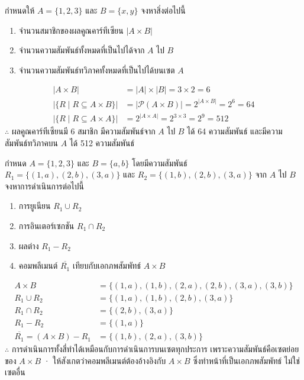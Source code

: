 \begin{ex}
\label{ex:total-relations-count}
กำหนดให้ $A = \{1, 2, 3\}$ และ $B = \{x, y\}$ จงหาสิ่งต่อไปนี้
\begin{enumerate}[label=\textbf{\arabic*.}]
    \item จำนวนสมาชิกของผลคูณคาร์ทีเซียน $|A \times B|$
    \item จำนวนความสัมพันธ์ทั้งหมดที่เป็นไปได้จาก $A$ ไป $B$
    \item จำนวนความสัมพันธ์ทวิภาคทั้งหมดที่เป็นไปได้บนเซต $A$
\end{enumerate}
\end{ex}
\begin{solution}
\begin{align*}
|A \times B| &= |A| \times |B| = 3 \times 2 = 6\\
\lvert\{R \mid R \subseteq A \times B\}\rvert &= \lvert \mathcal{P}(A \times B) \rvert = 2^{|A \times B|} = 2^6 = 64\\
\lvert\{R \mid R \subseteq A \times A\}\rvert &= 2^{|A \times A|} = 2^{3 \times 3} = 2^9 = 512
\end{align*}
$\therefore$ ผลคูณคาร์ทีเซียนมี 6 สมาชิก มีความสัมพันธ์จาก $A$ ไป $B$ ได้ 64 ความสัมพันธ์ และมีความสัมพันธ์ทวิภาคบน $A$ ได้ 512 ความสัมพันธ์ \solhere
\end{solution}

\begin{ex}
\label{ex:relation-operations}
กำหนด $A = \{1, 2, 3\}$ และ $B = \{a, b\}$ โดยมีความสัมพันธ์ $R_1 = \{(1,a), (2,b), (3,a)\}$ และ $R_2 = \{(1,b), (2,b), (3,a)\}$ จาก $A$ ไป $B$ จงหาการดำเนินการต่อไปนี้
\begin{enumerate}[label=\textbf{\arabic*.}]
    \item การยูเนียน $R_1 \cup R_2$
    \item การอินเตอร์เซกชัน $R_1 \cap R_2$
    \item ผลต่าง $R_1 - R_2$
    \item คอมพลีเมนต์ $\overline{R_1}$ เทียบกับเอกภพสัมพัทธ์ $A \times B$
\end{enumerate}
\end{ex}
\begin{solution}
\begin{align*}
A \times B &= \{(1,a),(1,b),(2,a),(2,b),(3,a),(3,b)\}\\
R_1 \cup R_2 &= \{(1,a),(1,b),(2,b),(3,a)\}\\
R_1 \cap R_2 &= \{(2,b),(3,a)\}\\
R_1 - R_2 &= \{(1,a)\}\\
\overline{R_1} = (A \times B) - R_1 &= \{(1,b),(2,a),(3,b)\}
\end{align*}
$\therefore$ การดำเนินการทั้งสี่ทำได้เหมือนกับการดำเนินการบนเซตทุกประการ เพราะความสัมพันธ์คือเซตย่อยของ $A \times B$ · ให้สังเกตว่าคอมพลีเมนต์ต้องอ้างอิงกับ $A \times B$ ซึ่งทำหน้าที่เป็นเอกภพสัมพัทธ์ ไม่ใช่เซตอื่น \solhere
\end{solution}

